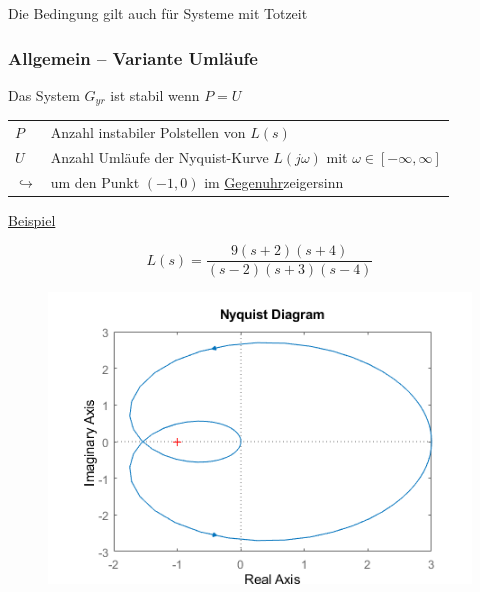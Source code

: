 \documentclass[
  10pt,
  a4paper,
  twocolumn]{article}
\makeatletter
\numberwithin{equation}{section}
\newenvironment{conditions}
  {\par\vspace{\abovedisplayskip}\noindent\begin{tabular}{>{$}l<{$} @{${}:{}$} l}}
  {\end{tabular}\par\vspace{\belowdisplayskip}}
\makeatother
\begin{document}
\begin{tcolorbox}[enhanced jigsaw, colframe=quarto-callout-note-color-frame, toptitle=1mm, title=\textcolor{quarto-callout-note-color}{\faInfo}\hspace{0.5em}{Totzeit}, bottomtitle=1mm, opacityback=0, left=2mm, opacitybacktitle=0.6, bottomrule=.15mm, leftrule=.75mm, coltitle=black, titlerule=0mm, colback=white, breakable, toprule=.15mm, colbacktitle=quarto-callout-note-color!10!white, rightrule=.15mm, arc=.35mm]

Die Bedingung gilt auch für Systeme mit Totzeit

\end{tcolorbox}

\hypertarget{allgemein-variante-umluxe4ufe}{%
\subsubsection{Allgemein -- Variante
Umläufe}\label{allgemein-variante-umluxe4ufe}}

Das System \(G_{yr}\) ist stabil wenn \(P=U\)

\begin{conditions}
  P & Anzahl instabiler Polstellen von $L(s)$ \\
  U & Anzahl Umläufe der Nyquist-Kurve $L(j\omega)$ mit $\omega\in [-\infty,\infty]$ \\
  \hookrightarrow & um den Punkt $(-1,0)$ im \underline{Gegenuhr}zeigersinn
\end{conditions}

\ul{Beispiel}

\[
L(s)=\frac{9(s+2)(s+4)}{(s-2)(s+3)(s-4)}
\]

\begin{figure}[H]

{\centering \includegraphics{images/paste-5.png}

}

\end{figure}
\end{document}
